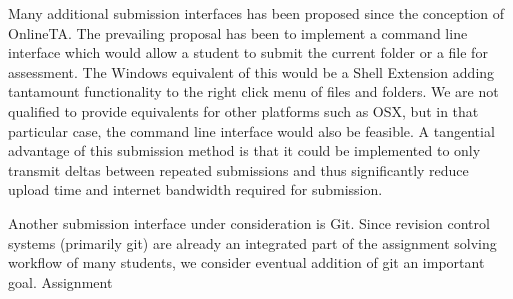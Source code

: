 Many additional submission interfaces has been proposed since the
conception of OnlineTA. The prevailing proposal has been to implement
a command line interface which would allow a student to submit the
current folder or a file for assessment. The Windows equivalent of
this would be a Shell Extension adding tantamount functionality to the
right click menu of files and folders. We are not qualified to provide
equivalents for other platforms such as OSX, but in that particular
case, the command line interface would also be feasible. A tangential
advantage of this submission method is that it could be implemented to
only transmit deltas between repeated submissions and thus
significantly reduce upload time and internet bandwidth required for
submission.

Another submission interface under consideration is Git. Since
revision control systems (primarily git) are already an integrated
part of the assignment solving workflow of many students, we consider
eventual addition of git an important goal. Assignment 







